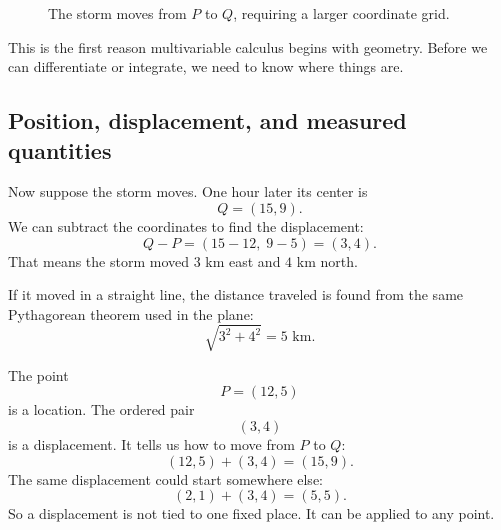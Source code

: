 \begin{figure}[h]
\centering
{}
\caption{The storm moves from $P$ to $Q$, requiring a larger coordinate grid.}
\end{figure}

This is the first reason multivariable calculus begins with geometry.  Before we can
differentiate or integrate, we need to know where things are.

\subsection{Position, displacement, and measured quantities}

Now suppose the storm moves.  One hour later its center is
\[
    Q=(15,9).
\]
We can subtract the coordinates to find the displacement:
\[
    Q-P=(15-12,\;9-5)=(3,4).
\]
That means the storm moved \(3\) km east and \(4\) km north.

If it moved in a straight line, the distance traveled is found from the same
Pythagorean theorem used in the plane:
\[
    \sqrt{3^2+4^2}=5 \text{ km}.
\]

\begin{example}
The point
\[
    P=(12,5)
\]
is a location.  The ordered pair
\[
    (3,4)
\]
is a displacement.  It tells us how to move from \(P\) to \(Q\):
\[
    (12,5)+(3,4)=(15,9).
\]
The same displacement could start somewhere else:
\[
    (2,1)+(3,4)=(5,5).
\]
So a displacement is not tied to one fixed place.  It can be applied to any point.
\end{example}

